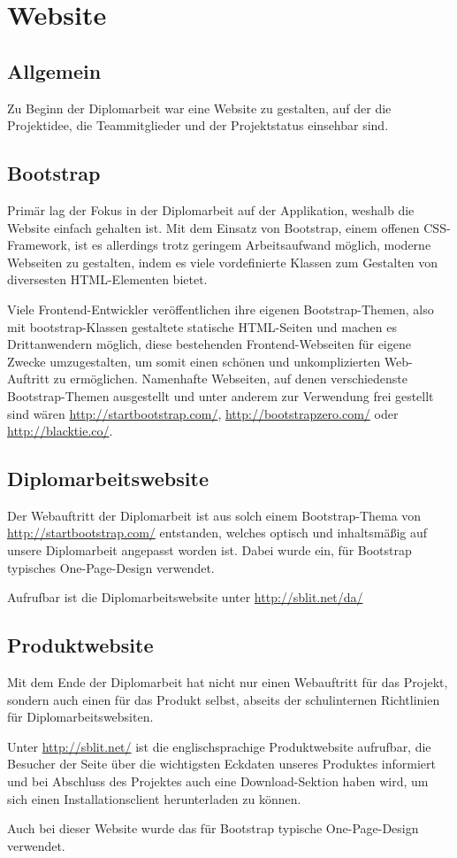 \chapter{Website}
\section{Allgemein}
Zu Beginn der Diplomarbeit war eine Website zu gestalten, auf der die Projektidee,
die Teammitglieder und der Projektstatus einsehbar sind.

\section{Bootstrap}
Primär lag der Fokus in der Diplomarbeit auf der Applikation, weshalb die Website
einfach gehalten ist. Mit dem Einsatz von Bootstrap, einem offenen CSS-Framework,
ist es allerdings trotz geringem Arbeitsaufwand möglich, moderne Webseiten zu gestalten,
indem es viele vordefinierte Klassen zum Gestalten von diversesten HTML-Elementen bietet.

Viele Frontend-Entwickler veröffentlichen ihre eigenen Bootstrap-Themen, also
mit bootstrap-Klassen gestaltete statische HTML-Seiten und machen es Drittanwendern
möglich, diese bestehenden Frontend-Webseiten für eigene Zwecke umzugestalten,
um somit einen schönen und unkomplizierten Web-Auftritt zu ermöglichen. Namenhafte
Webseiten, auf denen verschiedenste Bootstrap-Themen ausgestellt und unter
anderem zur Verwendung frei gestellt sind wären \url{http://startbootstrap.com/},
\url{http://bootstrapzero.com/} oder \url{http://blacktie.co/}.

\section{Diplomarbeitswebsite}
Der Webauftritt der Diplomarbeit ist aus solch einem Bootstrap-Thema von
\url{http://startbootstrap.com/} entstanden, welches optisch und inhaltsmäßig auf unsere
Diplomarbeit angepasst worden ist. Dabei wurde ein, für Bootstrap typisches
One-Page-Design verwendet.

Aufrufbar ist die Diplomarbeitswebsite unter \url{http://sblit.net/da/}

\section{Produktwebsite}
Mit dem Ende der Diplomarbeit hat \sblit nicht nur einen Webauftritt für das Projekt,
sondern auch einen für das Produkt selbst, abseits der schulinternen Richtlinien für Diplomarbeitswebsiten.

Unter \url{http://sblit.net/} ist die englischsprachige Produktwebsite aufrufbar,
die Besucher der Seite über die wichtigsten Eckdaten unseres Produktes informiert und bei
Abschluss des Projektes auch eine Download-Sektion haben wird, um sich einen Installationsclient herunterladen zu können.

Auch bei dieser Website wurde das für Bootstrap typische One-Page-Design verwendet.

